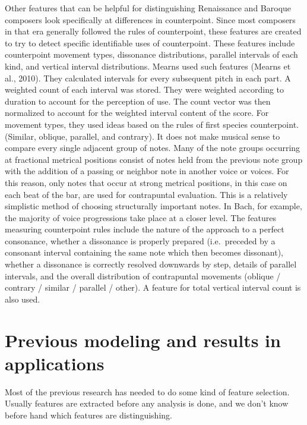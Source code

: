 \documentclass[12pt,twoside]{reedthesis}
\theoremstyle{definition}
\theoremstyle{definition}
\theoremstyle{definition}
\theoremstyle{remark}
\begin{document}
Other features that can be helpful for distinguishing Renaissance and
Baroque composers look specifically at differences in counterpoint.
Since most composers in that era generally followed the rules of
counterpoint, these features are created to try to detect specific
identifiable uses of counterpoint. These features include counterpoint
movement types, dissonance distributions, parallel intervals of each
kind, and vertical interval distributions. Mearns used such features
(Mearns et al., 2010). They calculated intervals for every subsequent
pitch in each part. A weighted count of each interval was stored. They
were weighted according to duration to account for the perception of
use. The count vector was then normalized to account for the weighted
interval content of the score. For movement types, they used ideas based
on the rules of first species counterpoint. (Similar, oblique, parallel,
and contrary). It does not make musical sense to compare every single
adjacent group of notes. Many of the note groups occurring at fractional
metrical positions consist of notes held from the previous note group
with the addition of a passing or neighbor note in another voice or
voices. For this reason, only notes that occur at strong metrical
positions, in this case on each beat of the bar, are used for
contrapuntal evaluation. This is a relatively simplistic method of
choosing structurally important notes. In Bach, for example, the
majority of voice progressions take place at a closer level. The
features measuring counterpoint rules include the nature of the approach
to a perfect consonance, whether a dissonance is properly prepared
(i.e.~preceded by a consonant interval containing the same note which
then becomes dissonant), whether a dissonance is correctly resolved
downwards by step, details of parallel intervals, and the overall
distribution of contrapuntal movements (oblique / contrary / similar /
parallel / other). A feature for total vertical interval count is also
used.

\section{Previous modeling and results in
applications}\label{previous-modeling-and-results-in-applications}

Most of the previous research has needed to do some kind of feature
selection. Usually features are extracted before any analysis is done,
and we don't know before hand which features are distinguishing.
\end{document}
